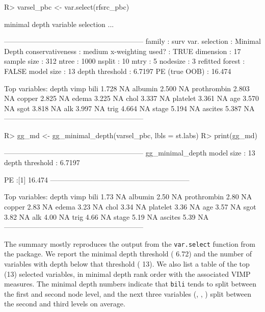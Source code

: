 \documentclass[article]{jss}
\begin{document}
\begin{Schunk}
\begin{Sinput}
R> varsel_pbc <- var.select(rfsrc_pbc)
\end{Sinput}
\begin{Soutput}
minimal depth variable selection ...


-----------------------------------------------------------
family             : surv 
var. selection     : Minimal Depth 
conservativeness   : medium 
x-weighting used?  : TRUE 
dimension          : 17 
sample size        : 312 
ntree              : 1000 
nsplit             : 10 
mtry               : 5 
nodesize           : 3 
refitted forest    : FALSE 
model size         : 13 
depth threshold    : 6.7197 
PE (true OOB)      : 16.474 


Top variables:
            depth vimp
bili        1.728   NA
albumin     2.500   NA
prothrombin 2.803   NA
copper      2.825   NA
edema       3.225   NA
chol        3.337   NA
platelet    3.361   NA
age         3.570   NA
sgot        3.818   NA
alk         3.997   NA
trig        4.664   NA
stage       5.194   NA
ascites     5.387   NA
-----------------------------------------------------------
\end{Soutput}
\begin{Sinput}
R> gg_md <- gg_minimal_depth(varsel_pbc, lbls = st.labs)
R> print(gg_md)
\end{Sinput}
\begin{Soutput}
-----------------------------------------------------------
gg_minimal_depth
model size         : 13 
depth threshold    : 6.7197 

PE :[1] 16.474
-----------------------------------------------------------

Top variables:
            depth vimp
bili         1.73   NA
albumin      2.50   NA
prothrombin  2.80   NA
copper       2.83   NA
edema        3.23   NA
chol         3.34   NA
platelet     3.36   NA
age          3.57   NA
sgot         3.82   NA
alk          4.00   NA
trig         4.66   NA
stage        5.19   NA
ascites      5.39   NA
-----------------------------------------------------------
\end{Soutput}
\end{Schunk}

The  summary mostly reproduces the output from
the \texttt{var.select} function from the  package.
We report the minimal depth threshold ( 6.72) and the
number of variables with depth below that threshold (
13). We also list a table of the top (13) selected variables, in minimal
depth rank order with the associated VIMP measures. The minimal depth
numbers indicate that \texttt{bili} tends to split between the first and
second node level, and the next three variables (,
, ) split between the second and third
levels on average.
\end{document}
